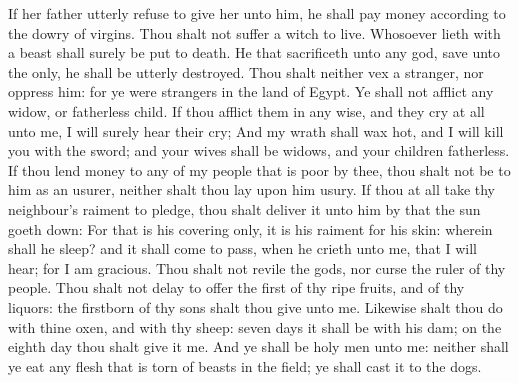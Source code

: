 \begin{biblechapter}
\verse If her father utterly refuse to give her unto him, he shall pay money according to the dowry of virgins.
\verse Thou shalt not suffer a witch to live.
\verse Whosoever lieth with a beast shall surely be put to death.
\verse He that sacrificeth unto any god, save unto the \LORD only, he shall be utterly destroyed.
\verse Thou shalt neither vex a stranger, nor oppress him: for ye were strangers in the land of Egypt.
\verse Ye shall not afflict any widow, or fatherless child.
\verse If thou afflict them in any wise, and they cry at all unto me, I will surely hear their cry;
\verse And my wrath shall wax hot, and I will kill you with the sword; and your wives shall be widows, and your children fatherless.
\verse If thou lend money to any of my people that is poor by thee, thou shalt not be to him as an usurer, neither shalt thou lay upon him usury.
\verse If thou at all take thy neighbour's raiment to pledge, thou shalt deliver it unto him by that the sun goeth down:
\verse For that is his covering only, it is his raiment for his skin: wherein shall he sleep? and it shall come to pass, when he crieth unto me, that I will hear; for I am gracious.
\verse Thou shalt not revile the gods, nor curse the ruler of thy people.
\verse Thou shalt not delay to offer the first of thy ripe fruits, and of thy liquors: the firstborn of thy sons shalt thou give unto me.
\verse Likewise shalt thou do with thine oxen, and with thy sheep: seven days it shall be with his dam; on the eighth day thou shalt give it me.
\verse And ye shall be holy men unto me: neither shall ye eat any flesh that is torn of beasts in the field; ye shall cast it to the dogs.
\end{biblechapter}

